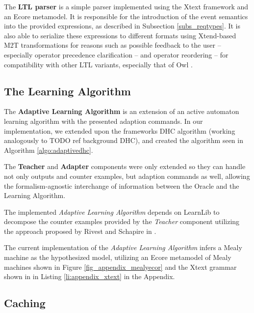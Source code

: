 The \textbf{LTL parser} is a simple parser implemented using the Xtext framework and an Ecore metamodel. It is responsible for the introduction of the event semantics into the provided expressions, as described in Subsection \ref{subs_reqtypes}. It is also able to serialize these expressions to different formats using Xtend-based M2T transformations for reasons such as possible feedback to the user -- especially operator precedence clarification -- and operator reordering -- for compatibility with other LTL variants, especially that of Owl \cite{Owl}.  

\subsection{The Learning Algorithm} \label{subsec_adaptivedhc}

The \textbf{Adaptive Learning Algorithm} is an extension of an active automaton learning algorithm with the presented adaption commands. In our implementation, we extended upon the frameworks DHC algorithm (working analogously to TODO ref background DHC), and created the algorithm seen in Algorithm \ref{algo:adaptivedhc}. 

The \textbf{Teacher} and \textbf{Adapter} components were only extended so they can handle not only outputs and counter examples, but adaption commands as well, allowing the formalism-agnostic interchange of information between the Oracle and the Learning Algorithm.

The implemented \textit{Adaptive Learning Algorithm} depends on LearnLib\cite{10.1007/978-3-319-21690-4_32} to decompose the counter examples provided by the \textit{Teacher} component utilizing the approach proposed by Rivest and Schapire in \cite{rivest1993inference}.

The current implementation of the \textit{Adaptive Learning Algorithm} infers a Mealy machine as the hypothesized model, utilizing an Ecore metamodel of Mealy machines shown in Figure \ref{fig_appendix_mealyecor} and the Xtext grammar shown in in Listing \ref{li:appendix_xtext} in the Appendix.



\subsection{Caching} \label{subsec_memoization}


